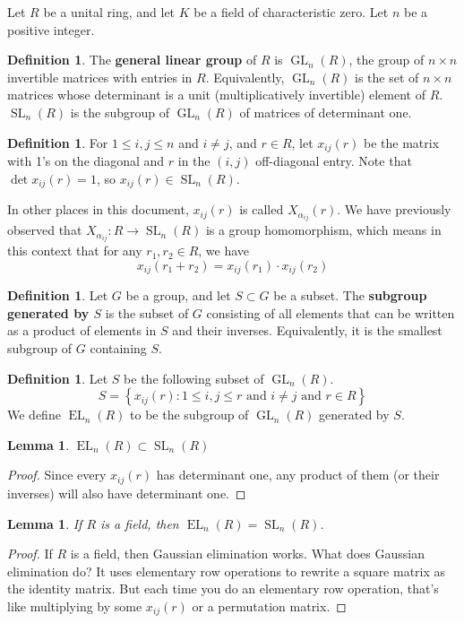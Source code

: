 \documentclass[12pt]{article}
\newtheorem{lemma}[theorem]{Lemma}
\theoremstyle{definition}
\newtheorem{definition}[theorem]{Definition}
\numberwithin{theorem}{subsection}
\newcommand{\lb}{\left\{}
\newcommand{\rb}{\right\}}
\newcommand{\tbf}{\textbf}
\newcommand{\noi}{\noindent}
\DeclareMathOperator{\EL}{EL}
\DeclareMathOperator{\SL}{SL}
\DeclareMathOperator{\GL}{GL}
\begin{document}
\noi Let $R$ be a unital ring, and let $K$ be a field of characteristic zero. Let $n$ be a positive integer.

\begin{definition}
The \tbf{general linear group} of $R$ is $\GL_n(R)$, the group of $n \times n$ invertible matrices with entries in $R$. Equivalently, $\GL_n(R)$ is the set of $n \times n$ matrices whose determinant is a unit (multiplicatively invertible) element of $R$. $\SL_n(R)$ is the subgroup of $\GL_n(R)$ of matrices of determinant one.
\end{definition}

\begin{definition}
For $1 \le i,j \le n$ and $i \neq j$, and $r \in R$, let $x_{ij}(r)$ be the matrix with 1's on the diagonal and $r$ in the $(i,j)$ off-diagonal entry. Note that $\det x_{ij}(r) = 1$, so $x_{ij}(r) \in \SL_n(R)$.

In other places in this document, $x_{ij}(r)$ is called $X_{\alpha_{ij}}(r)$. We have previously observed that $X_{\alpha_{ij}}:R \to \SL_n(R)$ is a group homomorphism, which means in this context that for any $r_1, r_2 \in R$, we have
\[
	x_{ij}(r_1 + r_2) = x_{ij}(r_1) \cdot x_{ij}(r_2)
\]
\end{definition}

\begin{definition}
Let $G$ be a group, and let $S \subset G$ be a subset. The \tbf{subgroup generated by $S$} is the subset of $G$ consisting of all elements that can be written as a product of elements in $S$ and their inverses. Equivalently, it is the smallest subgroup of $G$ containing $S$.
\end{definition}

\begin{definition}
Let $S$ be the following subset of $\GL_n(R)$.
\[
	S = \lb x_{ij}(r) : 1 \le i,j \le r \text{ and } i \neq j \text{ and } r \in R \rb
\]
We define $\EL_n(R)$ to be the subgroup of $\GL_n(R)$ generated by $S$.
\end{definition}

\begin{lemma}
$\EL_n(R) \subset \SL_n(R)$
\end{lemma}
\begin{proof}
Since every $x_{ij}(r)$ has determinant one, any product of them (or their inverses) will also have determinant one.
\end{proof}

\begin{lemma}
If $R$ is a field, then $\EL_n(R) = \SL_n(R)$.
\end{lemma}
\begin{proof}
If $R$ is a field, then Gaussian elimination works. What does Gaussian elimination do? It uses elementary row operations to rewrite a square matrix as the identity matrix. But each time you do an elementary row operation, that's like multiplying by some $x_{ij}(r)$ or a permutation matrix.
\end{proof}
\end{document}
